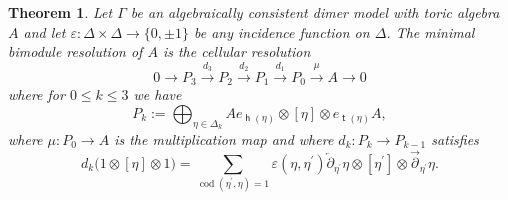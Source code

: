 \documentclass[11pt,a4paper]{amsart}
\numberwithin{equation}{section}
\newtheorem{theorem}{Theorem}[section]
\theoremstyle{definition}
\theoremstyle{remark}
\newcommand{\codim}{\operatorname{cod}}
\newcommand{\head}{\operatorname{\mathsf{h}}}
\newcommand{\tail}{\operatorname{\mathsf{t}}}
\begin{document}
  \begin{theorem}
  \label{thm:dimerresolution}
 Let $\Gamma$ be an algebraically consistent dimer model with toric algebra $A$ and let $\varepsilon\colon \Delta\times \Delta \to \{0,\pm 1\}$ be any incidence function on $\Delta$. The minimal bimodule resolution of $A$ is the \emph{cellular resolution}
\[
 0\longrightarrow  P_3  \stackrel{d_3}{\longrightarrow} P_2  \stackrel{d_2}{\longrightarrow} P_1  \stackrel{d_1}{\longrightarrow} P_0 \stackrel{\mu}{\longrightarrow} A \longrightarrow 0
\]
 where for $0\leq k\leq 3$ we have
\[
P_k:=   \bigoplus_{\eta\in \Delta_k} A e_{\head(\eta)} \otimes [\eta] \otimes e_{\tail(\eta)} A,
 \]
where $\mu\colon P_0\to A$ is the multiplication map and  where $ d_k\colon P_k\longrightarrow P_{k-1}$ satisfies
\[
d_k\big(1\otimes[\eta]\otimes 1\big) = \sum_{\codim(\eta^\prime,\eta)=1} \varepsilon(\eta,\eta^\prime) \overleftarrow{\partial}_{\!\!\eta^\prime}\eta\otimes [\eta^\prime]\otimes \overrightarrow{\partial}_{\!\!\eta^\prime}\eta.
\]
 \end{theorem} 
\end{document}
